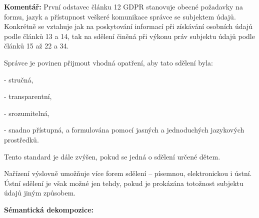 \noindent \textbf{Komentář:}
První odstavec článku 12 GDPR stanovuje obecné požadavky na formu, jazyk a přístupnost veškeré komunikace správce se subjektem údajů. Konkrétně se vztahuje jak na poskytování informací při získávání osobních údajů podle článků 13 a 14, tak na sdělení činěná při výkonu práv subjektu údajů podle článků 15 až 22 a 34.

Správce je povinen přijmout vhodná opatření, aby tato sdělení byla:

- stručná,

- transparentní,

- srozumitelná,

- snadno přístupná, a formulována pomocí jasných a jednoduchých jazykových prostředků. 

Tento standard je dále zvýšen, pokud se jedná o sdělení určené dětem.

Nařízení výslovně umožňuje více forem sdělení – písemnou, elektronickou i ústní. Ústní sdělení je však možné jen tehdy, pokud je prokázána totožnost subjektu údajů jiným způsobem.
\vspace{1em}

\noindent \textbf{Sémantická dekompozice:}


